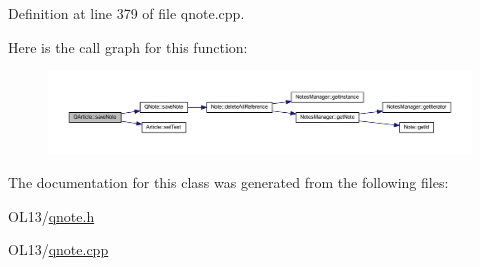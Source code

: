 Definition at line 379 of file qnote.\+cpp.

Here is the call graph for this function\+:\nopagebreak
\begin{figure}[H]
\begin{center}
\leavevmode
\includegraphics[width=350pt]{class_q_article_ae59d03688947d16b86f9ab10384894ec_cgraph}
\end{center}
\end{figure}


The documentation for this class was generated from the following files\+:\begin{DoxyCompactItemize}
\item 
O\+L13/\hyperlink{qnote_8h}{qnote.\+h}\item 
O\+L13/\hyperlink{qnote_8cpp}{qnote.\+cpp}\end{DoxyCompactItemize}

